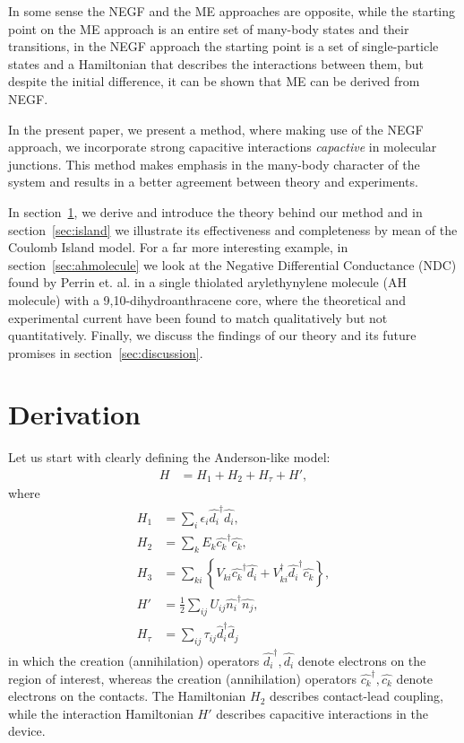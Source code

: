\documentclass{article}
\begin{document}
\begin{multicols}{2}
        In some sense the NEGF and the ME approaches are opposite, while the starting point on the ME approach is an entire set of many-body states and their transitions, in the NEGF approach the starting point is a set of single-particle states and a Hamiltonian that describes the interactions between them, but despite the initial difference, it can be shown that ME can be derived from NEGF.
            
        In the present paper, we present a method, where making use of the NEGF approach, we incorporate strong capacitive interactions \emph{capactive} in molecular junctions. This method makes emphasis in the many-body character of the system and results in a better agreement between theory and experiments.
        
        In section~\ref{sec:derivation}, we derive and introduce the theory behind our method and in section~\ref{sec:island} we illustrate its effectiveness and completeness by mean of the Coulomb Island model. For a far more interesting example, in section~\ref{sec:ahmolecule} we look at the Negative Differential Conductance (NDC) found by Perrin et. al. \cite{perrinnano} in a single thiolated arylethynylene molecule (AH molecule) with a 9,10-dihydroanthracene core, where the theoretical and experimental current have been found to match qualitatively but not quantitatively. Finally, we discuss the findings of our theory and its future promises in section~\ref{sec:discussion}.


    
    \section{Derivation}\label{sec:derivation}
        Let us start with clearly defining the Anderson-like model:
        \begin{align}
            H &= H_1 + H_2 + H_\tau + H', \label{eq:hamiltonian}
        \end{align}
        where
        \begin{align*}
        H_1 &= \sum_i \epsilon_i \hat{d_i}^\dagger \hat{d_i}, \\
        H_2 &= \sum_k E_k \hat{c_k}^\dagger \hat{c_k}, \\
        H_3 &= \sum_{ki}\left\{ V_{ki} \hat{c_k}^\dagger \hat{d_i} +  V_{ki}^\dagger \hat{d_i}^\dagger \hat{c_k} \right\},\\
        H' &= \frac{1}{2} \sum_{ij} U_{ij} \hat{n_i}^\dagger \hat{n_j},\\
        H_\tau &= \sum_{ij} \tau_{ij} \hat{d}_i^\dagger \hat{d}_j
        \end{align*}
        in which the creation (annihilation) operators $\hat{d_i}^\dagger, \hat{d_i}$ denote electrons on the region of interest, whereas the creation (annihilation) operators $\hat{c_k}^\dagger, \hat{c_k}$ denote electrons on the contacts. The Hamiltonian $H_2$ describes contact-lead coupling, while the interaction Hamiltonian $H'$ describes capacitive interactions in the device.
        

\end{multicols}
\end{document}
